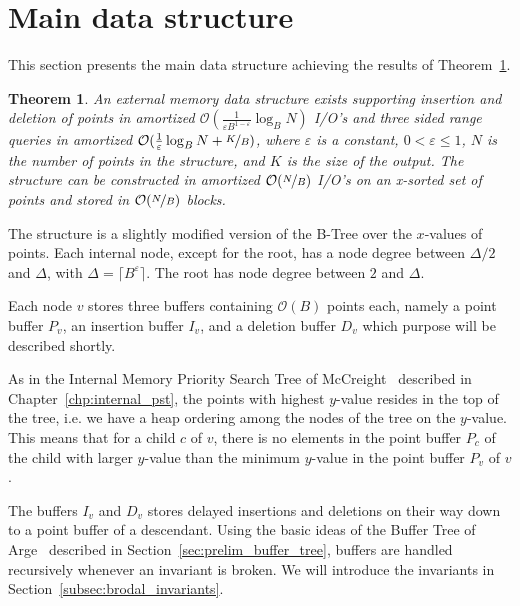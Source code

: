 \documentclass[twoside,11pt,openright]{report}
\def \epsilon {\varepsilon}
\newtheorem{theorem}{Theorem}
\begin{document}

\section{Main data structure}
\label{sec:main_data_structure}
This section presents the main data structure achieving the results of Theorem~\ref{thm:main_structure}.
\begin{theorem}
\label{thm:main_structure}
An external memory data structure exists supporting insertion and deletion of points in amortized $\mathcal{O}(\frac{1}{\epsilon B^{1-\epsilon}} \log_B N)$ I/O's and three sided range queries in amortized $\mathcal{O}(\frac{1}{\epsilon} \log_B N + \nicefrac{K}{B})$, where $\epsilon$ is a constant, $0 < \epsilon \leq 1$, $N$ is the number of points in the structure, and $K$ is the size of the output. The structure can be constructed in amortized $\mathcal{O}(\nicefrac{N}{B})$ I/O's on an x-sorted set of points and stored in $\mathcal{O}(\nicefrac{N}{B})$ blocks.
\end{theorem}

The structure is a slightly modified version of the B-Tree over the $x$-values of points. Each internal node, except for the root, has a node degree between $\Delta/2$ and $\Delta$, with $\Delta = \lceil B^\epsilon \rceil$. The root has node degree between $2$ and $\Delta$.

Each node $v$ stores three buffers containing $\mathcal{O}(B)$ points each, namely a point buffer $P_v$, an insertion buffer $I_v$, and a deletion buffer $D_v$ which purpose will be described shortly.

As in the Internal Memory Priority Search Tree of McCreight~\cite{DBLP:journals/siamcomp/McCreight85} described in Chapter~\ref{chp:internal_pst}, the points with highest $y$-value resides in the top of the tree, i.e. we have a heap ordering among the nodes of the tree on the $y$-value. This means that for a child $c$ of $v$, there is no elements in the point buffer $P_c$ of the child with larger $y$-value than the minimum $y$-value in the point buffer $P_v$ of $v$.

The buffers $I_v$ and $D_v$ stores delayed insertions and deletions on their way down to a point buffer of a descendant. Using the basic ideas of the Buffer Tree of Arge~\cite{Arge:1995:BTN:645930.672850} described in Section~\ref{sec:prelim_buffer_tree}, buffers are handled recursively whenever an invariant is broken. We will introduce the invariants in Section~\ref{subsec:brodal_invariants}.
\end{document}
